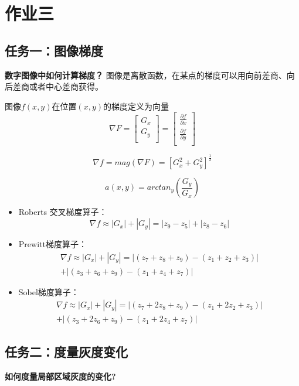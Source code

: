 \documentclass[10pt,twocolumn,letterpaper]{article}
\begin{document}
\clearpage

\section{作业三}

\subsection{任务一：图像梯度}
\label{sec:greetings}
\textbf{数字图像中如何计算梯度？}
图像是离散函数，在某点的梯度可以用向前差商、向后差商或者中心差商获得。

图像$f(x,y)$在位置$(x,y)$的梯度定义为向量
$$ \nabla F=
\left[
    \begin{array}{c}
        G_x \\
        G_y \\
    \end{array}
\right]
=
\left[
    \begin{array}{c}
        \frac{\partial f}{\partial x} \\
        \frac{\partial f}{\partial y} \\
    \end{array}
\right]
$$

$$
\nabla f = mag(\nabla F) = [G_x^2+G_y^2]^{\frac{1}{2}}
$$

$$
a(x,y)=arctan_y(\frac{G_y}{G_x})
$$

\begin{itemize}
   \item Roberts 交叉梯度算子：   
   $$
   \nabla f  \approx |G_x|+|G_y|=|z_9-z_5|+|z_8-z_6| 
   $$

   \item Prewitt梯度算子：  
   \begin{multline*}
      \nabla f  \approx |G_x|+|G_y|=|(z_7+z_8+z_9)-(z_1+z_2+z_3)| \\
      +|(z_3+z_6+z_9)-(z_1+z_4+z_7)|
   \end{multline*}

   \item Sobel梯度算子：  
   \begin{multline*}
      \nabla f  \approx |G_x|+|G_y|=|(z_7+2z_8+z_9)-(z_1+2z_2+z_3)| \\
      +|(z_3+2z_6+z_9)-(z_1+2z_4+z_7)|
   \end{multline*}


\end{itemize}

\subsection{任务二：度量灰度变化}
\textbf{如何度量局部区域灰度的变化?}
\end{document}
